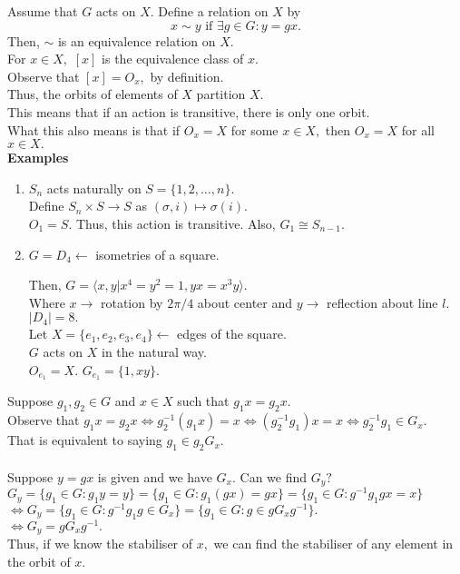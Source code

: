 \documentclass[12 pt, a4paper, toc=graduated, oneside]{article}
\theoremstyle{definition}
\begin{document}
Assume that $G$ acts on $X.$ Define a relation on $X$ by
\[x \sim y \text{ if } \exists g \in G: y = gx.\]
Then, $\sim$ is an equivalence relation on $X.$\\
For $x \in X,$ $[x]$ is the equivalence class of $x.$\\
Observe that $[x] = O_x,$ by definition.\\
Thus, the orbits of elements of $X$ partition $X.$\\
This means that if an action is transitive, there is only one orbit.\\
What this also means is that if $O_x = X$ for some $x \in X,$ then $O_x = X$ for all $x \in X.$\\
\textbf{Examples}
\begin{enumerate}[nosep] 
	\item $S_n$ acts naturally on $S = \{1, 2, \ldots, n\}.$\\
	Define $S_n \times S \to S$ as $(\sigma, i) \mapsto \sigma(i).$\\
	$O_1 = S.$ Thus, this action is transitive. Also, $G_1 \cong S_{n-1}.$
	\item $G = D_4 \longleftarrow$ isometries of a square.\\
	\begin{center}
	\end{center}
Then, $G = \langle x, y | x^4 = y^2 = 1, yx = x^3y\rangle.$\\
Where $x \longrightarrow$ rotation by $2\pi/4$ about center and $y \longrightarrow$ reflection about line $l.$\\
$|D_4| = 8.$\\
Let $X = \{e_1, e_2, e_3, e_4\} \longleftarrow$ edges of the square.\\
$G$ acts on $X$ in the natural way.\\
$O_{e_1} = X.$ $G_{e_1} = \{1, xy\}.$
\end{enumerate}
Suppose $g_1, g_2 \in G$ and $x \in X$ such that $g_1x = g_2x.$\\
Observe that $g_1x = g_2x \iff g_2^{-1}(g_1x) = x \iff (g_2^{-1}g_1)x = x \iff g_2^{-1}g_1 \in G_x.$\\
That is equivalent to saying $g_1 \in g_2G_x.$\\~\\
Suppose $y = gx$ is given and we have $G_x.$ Can we find $G_y?$\\
$G_y = \{g_1 \in G : g_1 y = y\} = \{g_1 \in G : g_1(gx) = gx\} = \{g_1 \in G : g^{-1}g_1gx = x\}$\\
$\iff G_y = \{g_1 \in G : g^{-1}g_1g \in G_x\} = \{g_1 \in G : g \in gG_xg^{-1}\}.$\\
$\iff G_y = gG_xg^{-1}.$\\
Thus, if we know the stabiliser of $x,$ we can find the stabiliser of any element in the orbit of $x.$
\end{document}
